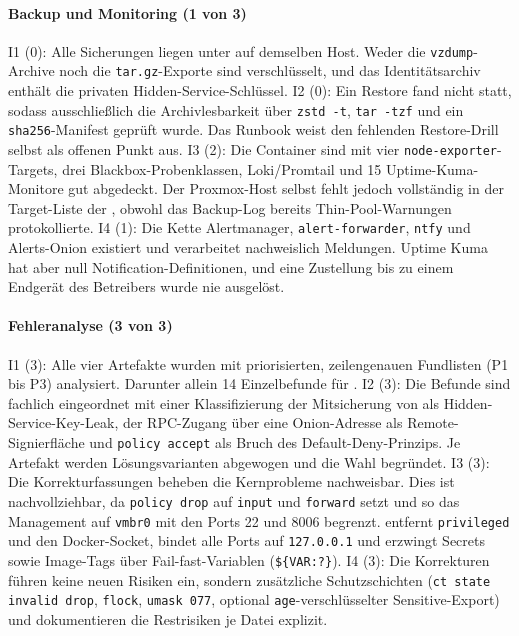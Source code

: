 \paragraph{Backup und Monitoring (1 von 3)}
I1 (0): Alle Sicherungen liegen unter  auf demselben Host. Weder die \texttt{vzdump}-Archive noch die \texttt{tar.gz}-Exporte sind verschlüsselt, und das Identitätsarchiv enthält die privaten Hidden-Service-Schlüssel.\cite{backupscriptA,selfauditA}
I2 (0): Ein Restore fand nicht statt, sodass ausschließlich die Archivlesbarkeit über \texttt{zstd -t}, \texttt{tar -tzf} und ein \texttt{sha256}-Manifest geprüft wurde.
Das Runbook weist den fehlenden Restore-Drill selbst als offenen Punkt aus.\cite{backupscriptA,runbookA}
I3 (2): Die Container sind mit vier \texttt{node-exporter}-Targets,
drei Blackbox-Probenklassen, Loki/Promtail und 15 Uptime-Kuma-Monitore gut abgedeckt.
Der Proxmox-Host selbst fehlt jedoch vollständig in der Target-Liste der
, obwohl das Backup-Log bereits Thin-Pool-Warnungen protokollierte.\cite{prometheusconfigA,selfauditA,runbookA}
I4 (1): Die Kette Alertmanager, \texttt{alert-forwarder}, \texttt{ntfy} und Alerts-Onion existiert und verarbeitet nachweislich Meldungen. 
Uptime Kuma hat aber null Notification-Definitionen, und eine Zustellung bis zu einem Endgerät
des Betreibers wurde nie ausgelöst.\cite{selfauditA,runbookA}

\paragraph{Fehleranalyse (3 von 3)}
I1 (3): Alle vier Artefakte wurden mit priorisierten, zeilengenauen Fundlisten (P1 bis P3) analysiert. Darunter allein 14 Einzelbefunde für .\cite{artefaktpruefungA}
I2 (3): Die Befunde sind fachlich eingeordnet mit einer Klassifizierung der Mitsicherung von
 als Hidden-Service-Key-Leak, der \ac{RPC}-Zugang über eine Onion-Adresse als Remote-Signierfläche und \texttt{policy accept} als Bruch des Default-Deny-Prinzips.
Je Artefakt werden Lösungsvarianten abgewogen und die Wahl begründet.\cite{artefaktpruefungA}
I3 (3): Die Korrekturfassungen beheben die Kernprobleme nachweisbar. Dies ist nachvollziehbar, da
 \texttt{policy drop} auf \texttt{input} und
\texttt{forward} setzt und so das Management auf \texttt{vmbr0} mit den Ports 22
und 8006 begrenzt.
 entfernt \texttt{privileged} und den Docker-Socket, bindet alle Ports auf \texttt{127.0.0.1} und erzwingt Secrets sowie Image-Tags über Fail-fast-Variablen (\texttt{\$\{VAR:?\}}).\cite{artefaktpruefungA}
I4 (3): Die Korrekturen führen keine neuen Risiken ein, sondern zusätzliche Schutzschichten (\texttt{ct state invalid drop}, \texttt{flock}, \texttt{umask 077}, optional \texttt{age}-verschlüsselter Sensitive-Export) und dokumentieren die Restrisiken je Datei explizit.\cite{artefaktpruefungA}

